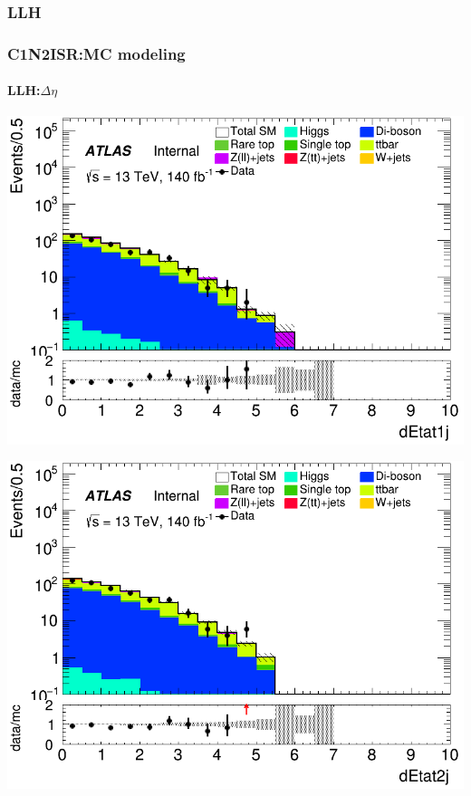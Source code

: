 \documentclass[usenames,dvipsnames]{beamer}
\begin{document}
\subsubsection{LLH}
\begin{frame}
\frametitle{C1N2ISR:MC modeling}
\framesubtitle{LLH:\quad $\Delta\eta$}
    \begin{minipage}{0.32\textwidth}
        \centering
        \includegraphics[width=\textwidth]{graphics/LLH_met/LLH_met_dEtat1j.png}
    \end{minipage}
    \hfill
    \begin{minipage}{0.32\textwidth}
        \centering
        \includegraphics[width=\textwidth]{graphics/LLH_met/LLH_met_dEtat2j.png}
    \end{minipage}
    \hfill

\end{frame}
\end{document}
